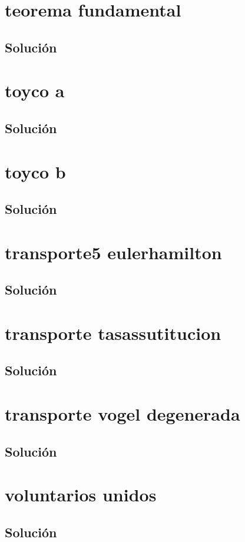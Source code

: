 \section{teorema fundamental}

\subsection*{Solución}

\clearpage
\section{toyco a}

\subsection*{Solución}

\clearpage
\section{toyco b}

\subsection*{Solución}

\clearpage
\section{transporte5 eulerhamilton}

\subsection*{Solución}

\clearpage
\section{transporte tasassutitucion}

\subsection*{Solución}

\clearpage
\section{transporte vogel degenerada}

\subsection*{Solución}

\clearpage
\section{voluntarios unidos}

\subsection*{Solución}

\clearpage


